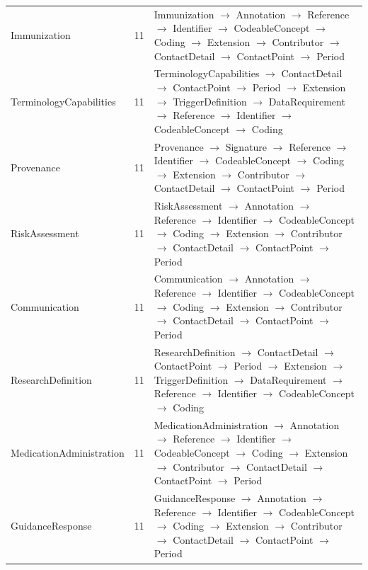 \begin{longtable}{lrl}
Immunization & 11 & Immunization $\rightarrow$ Annotation $\rightarrow$ Reference $\rightarrow$ Identifier $\rightarrow$ CodeableConcept $\rightarrow$ Coding $\rightarrow$ Extension $\rightarrow$ Contributor $\rightarrow$ ContactDetail $\rightarrow$ ContactPoint $\rightarrow$ Period \\
TerminologyCapabilities & 11 & TerminologyCapabilities $\rightarrow$ ContactDetail $\rightarrow$ ContactPoint $\rightarrow$ Period $\rightarrow$ Extension $\rightarrow$ TriggerDefinition $\rightarrow$ DataRequirement $\rightarrow$ Reference $\rightarrow$ Identifier $\rightarrow$ CodeableConcept $\rightarrow$ Coding \\
Provenance & 11 & Provenance $\rightarrow$ Signature $\rightarrow$ Reference $\rightarrow$ Identifier $\rightarrow$ CodeableConcept $\rightarrow$ Coding $\rightarrow$ Extension $\rightarrow$ Contributor $\rightarrow$ ContactDetail $\rightarrow$ ContactPoint $\rightarrow$ Period \\
RiskAssessment & 11 & RiskAssessment $\rightarrow$ Annotation $\rightarrow$ Reference $\rightarrow$ Identifier $\rightarrow$ CodeableConcept $\rightarrow$ Coding $\rightarrow$ Extension $\rightarrow$ Contributor $\rightarrow$ ContactDetail $\rightarrow$ ContactPoint $\rightarrow$ Period \\
Communication & 11 & Communication $\rightarrow$ Annotation $\rightarrow$ Reference $\rightarrow$ Identifier $\rightarrow$ CodeableConcept $\rightarrow$ Coding $\rightarrow$ Extension $\rightarrow$ Contributor $\rightarrow$ ContactDetail $\rightarrow$ ContactPoint $\rightarrow$ Period \\
ResearchDefinition & 11 & ResearchDefinition $\rightarrow$ ContactDetail $\rightarrow$ ContactPoint $\rightarrow$ Period $\rightarrow$ Extension $\rightarrow$ TriggerDefinition $\rightarrow$ DataRequirement $\rightarrow$ Reference $\rightarrow$ Identifier $\rightarrow$ CodeableConcept $\rightarrow$ Coding \\
MedicationAdministration & 11 & MedicationAdministration $\rightarrow$ Annotation $\rightarrow$ Reference $\rightarrow$ Identifier $\rightarrow$ CodeableConcept $\rightarrow$ Coding $\rightarrow$ Extension $\rightarrow$ Contributor $\rightarrow$ ContactDetail $\rightarrow$ ContactPoint $\rightarrow$ Period \\
GuidanceResponse & 11 & GuidanceResponse $\rightarrow$ Annotation $\rightarrow$ Reference $\rightarrow$ Identifier $\rightarrow$ CodeableConcept $\rightarrow$ Coding $\rightarrow$ Extension $\rightarrow$ Contributor $\rightarrow$ ContactDetail $\rightarrow$ ContactPoint $\rightarrow$ Period \\

\end{longtable}

